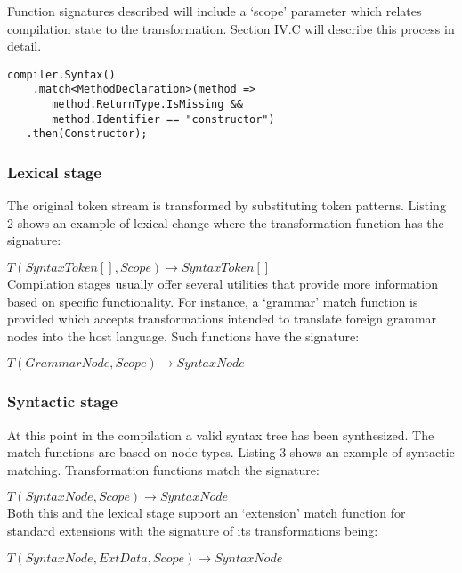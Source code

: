 \documentclass[conference]{IEEEtran}
\begin{document}
Function signatures described will include a `scope' parameter which relates compilation state to the transformation. Section IV.C will describe this process in detail.

\begin{lstlisting}[caption=Constructor Extension, captionpos= b, basicstyle=\small]
compiler.Syntax()
    .match<MethodDeclaration>(method => 
       method.ReturnType.IsMissing && 
       method.Identifier == "constructor")    
   .then(Constructor); 
\end{lstlisting}

\subsubsection{Lexical stage}

The original token stream is transformed by substituting token patterns. Listing 2 shows an example of lexical change where the transformation function has the signature:

\begin{math}T(SyntaxToken[], Scope) \rightarrow SyntaxToken[]\end{math} \\

Compilation stages usually offer several utilities that provide more information based on specific functionality. For instance, a `grammar' match function is provided which accepts transformations 
intended to translate foreign grammar nodes into the host language. Such functions have the signature:

$T(GrammarNode, Scope) \rightarrow SyntaxNode$ \\

\subsubsection{Syntactic stage}

At this point in the compilation a valid syntax tree has been synthesized. The match functions are based on node types. Listing 3 shows an example of syntactic matching.
Transformation functions match the signature:

$T(SyntaxNode, Scope) \rightarrow SyntaxNode$ \\

Both this and the lexical stage support an `extension' match function for standard extensions with the signature of its transformations being:

$T(SyntaxNode, ExtData, Scope) \rightarrow SyntaxNode$ \\
\end{document}
